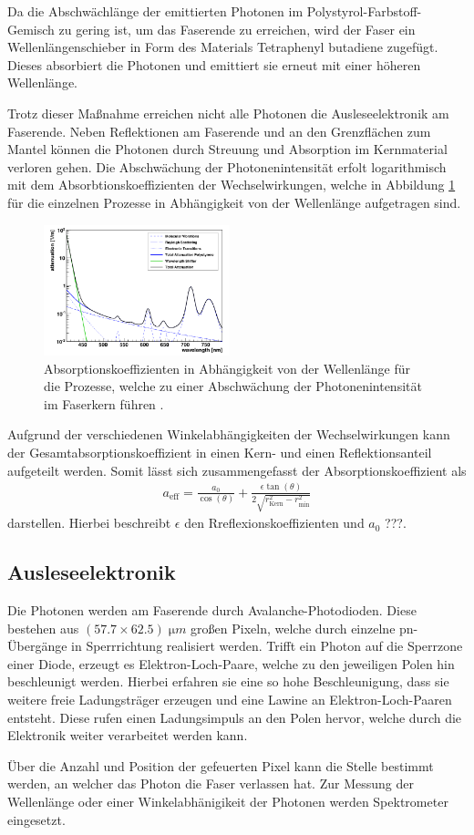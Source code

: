 Da die Abschwächlänge der emittierten Photonen im Polystyrol-Farbstoff-Gemisch zu gering ist, um das Faserende zu erreichen, wird der Faser ein Wellenlängenschieber in Form des Materials Tetraphenyl butadiene zugefügt. Dieses absorbiert die Photonen und emittiert sie erneut mit einer höheren Wellenlänge.

Trotz dieser Maßnahme erreichen nicht alle Photonen die Ausleseelektronik am Faserende. Neben Reflektionen am Faserende und an den Grenzflächen zum Mantel können die Photonen durch Streuung und Absorption im Kernmaterial verloren gehen. Die Abschwächung der Photonenintensität erfolt logarithmisch mit dem Absorbtionskoeffizienten der Wechselwirkungen, welche in Abbildung \ref{fig:ww} für die einzelnen Prozesse in Abhängigkeit von der Wellenlänge aufgetragen sind.\\
\begin{figure}
    \includegraphics[width=0.48\textwidth]{plots/Absorption.png}
    \caption{Absorptionskoeffizienten in Abhängigkeit von der Wellenlänge für die Prozesse, welche zu einer Abschwächung der Photonenintensität im Faserkern führen \cite{anleitung}.}
    \label{fig:ww}
  \end{figure}
  \FloatBarrier
Aufgrund der verschiedenen Winkelabhängigkeiten der Wechselwirkungen kann der Gesamtabsorptionskoeffizient in einen Kern- und einen Reflektionsanteil aufgeteilt werden. Somit lässt sich zusammengefasst der Absorptionskoeffizient als 
\begin{align}
    a_\mathrm{eff} = \frac{a_0}{\cos(\theta)} + \frac{\epsilon \tan(\theta)}{2 \sqrt{r_\mathrm{Kern}^2 - r_\mathrm{min}^2}}
    \label{eq:9}
\end{align}
darstellen. Hierbei beschreibt $\epsilon$ den Rreflexionskoeffizienten und $a_0$ ???.

\subsection{Ausleseelektronik}
Die Photonen werden am Faserende durch Avalanche-Photodioden. Diese bestehen aus $(57.7 \times 62.5)\;\si{\micro m}$ großen Pixeln, welche durch einzelne pn-Übergänge in Sperrrichtung realisiert werden. Trifft ein Photon auf die Sperrzone einer Diode, erzeugt es Elektron-Loch-Paare, welche zu den jeweiligen Polen hin beschleunigt werden. Hierbei erfahren sie eine so hohe Beschleunigung, dass sie weitere freie Ladungsträger erzeugen und eine Lawine an Elektron-Loch-Paaren entsteht. Diese rufen einen Ladungsimpuls an den Polen hervor, welche durch die Elektronik weiter verarbeitet werden kann.

Über die Anzahl und Position der gefeuerten Pixel kann die Stelle bestimmt werden, an welcher das Photon die Faser verlassen hat. Zur Messung der Wellenlänge oder einer Winkelabhänigikeit der Photonen werden Spektrometer eingesetzt. 